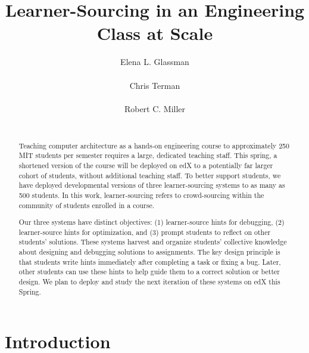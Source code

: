 \documentclass{sigchi}
\begin{document}
\title{Learner-Sourcing in an Engineering Class at Scale}

\author{
\alignauthor Elena L. Glassman\\
\\
\alignauthor Chris Terman\\
\\
\alignauthor Robert C. Miller\\
\\
}

\maketitle

\begin{abstract}
Teaching computer architecture as a hands-on engineering course to approximately 250 MIT students per semester requires a large, dedicated teaching staff. This spring, a shortened version of the course will be deployed on edX to a potentially far larger cohort of students, without additional teaching staff. To better support students, we have deployed developmental versions of three learner-sourcing systems to as many as 500 students. In this work, learner-sourcing refers to crowd-sourcing within the community of students enrolled in a course. 

Our three systems have distinct objectives: (1) learner-source hints for debugging, (2) learner-source hints for optimization, and (3) prompt students to reflect on other students' solutions. These systems harvest and organize students' collective knowledge about designing and debugging solutions to assignments. The key design principle is that students write hints immediately after completing a task or fixing a bug. Later, other students can use these hints to help guide them to a correct solution or better design. We plan to deploy and study the next iteration of these systems on edX this Spring.
\end{abstract}




\section{Introduction}
\end{document}
